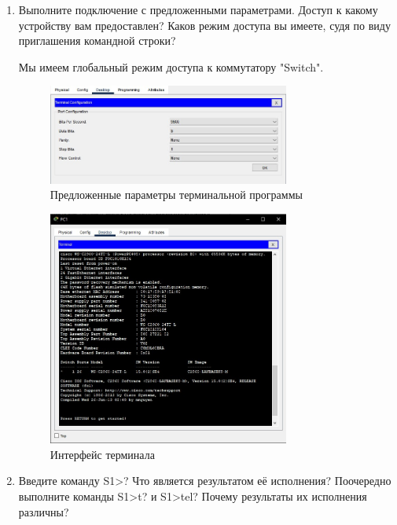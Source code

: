 \documentclass[bachelor, och, labwork]{shiza}
\begin{document}
\begin{enumerate}
    \item Выполните подключение  с предложенными параметрами. Доступ к какому устройству вам предоставлен? Каков режим 
    доступа вы имеете, судя по виду приглашения командной строки? 

    Мы имеем глобальный режим доступа к коммутатору "Switch".

    \begin{figure}[H]
        \centering      %
        \includegraphics[width=0.75\textwidth]{5}
        \caption{Предложенные параметры терминальной программы}
        \label{fig:image1}
    \end{figure}

    \begin{figure}[H]
        \centering      %
        \includegraphics[width=0.75\textwidth]{6}
        \caption{Интерфейс терминала}
        \label{fig:image1}
    \end{figure}

    \item Введите команду S1>? Что является результатом её исполнения? Поочередно выполните команды S1>t? и S1>tel? Почему 
    результаты их исполнения различны?


\end{enumerate}
\end{document}
